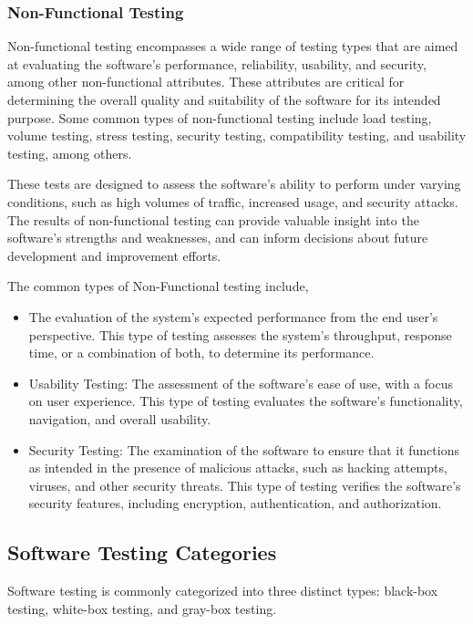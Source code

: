 \subsubsection{Non-Functional Testing}
Non-functional testing encompasses a wide range of testing types that are aimed at evaluating the
software's performance, reliability, usability, and security, among other non-functional attributes.
These attributes are critical for determining the overall quality and suitability of the software
for its intended purpose. Some common types of non-functional testing include load testing,
volume testing, stress testing, security testing, compatibility testing, and
usability testing, among others.

These tests are designed to assess the software's ability to perform under varying conditions,
such as high volumes of traffic, increased usage, and security attacks. The results of
non-functional testing can provide valuable insight into the software's strengths
and weaknesses, and can inform decisions about future development and improvement efforts.

The common types of Non-Functional testing include,
\begin{itemize}
        \item The evaluation of the system's expected performance from the end user's perspective.
        This type of testing assesses the system's throughput, response time, or a combination of
        both, to determine its performance\cite{weyuker2000experience}.
        \item Usability Testing: The assessment of the software's ease of use,
        with a focus on user experience. This type of testing evaluates the software's
        functionality, navigation, and overall usability.
        \item Security Testing: The examination of the software to ensure that it functions as
        intended in the presence of malicious attacks, such as hacking attempts, viruses,
        and other security threats. This type of testing verifies the software's security features,
        including encryption, authentication, and authorization.
\end{itemize}

\subsection{Software Testing Categories}
Software testing is commonly categorized into three distinct types:
black-box testing, white-box testing, and gray-box testing.

